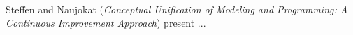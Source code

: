 

\ \hline \ %

Steffen and Naujokat
\cite{isola-2016-steffen}
({\em Conceptual Unification of Modeling and Programming:
A Continuous Improvement Approach})
present ...

